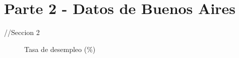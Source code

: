 \documentclass[11pt,a4paper]{article}
\begin{document}
\clearpage
\section*{Parte 2 - Datos de Buenos Aires}

//Seccion 2
\begin{figure}[!h]
    \centering
    \caption{Tasa de desempleo (\%)}
    \label{fig:my_label}
\end{figure}
\end{document}
